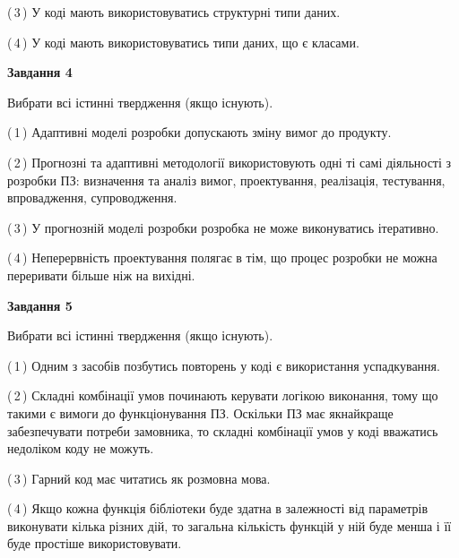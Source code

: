 \documentclass[10pt, ukrainian]{article}
\begin{document}
{\begin {large}
(\,3\,) У коді мають використовуватись структурні типи даних. %



(\,4\,) У коді мають використовуватись типи даних, що є класами. %


{\begin {center}\textbf{Завдання 4}\end {center}}\par
Вибрати всі істинні твердження (якщо існують).\par
\vspace{2mm}



(\,1\,) Адаптивні моделі розробки допускають зміну вимог до продукту. %



(\,2\,) Прогнозні та адаптивні методології використовують одні ті самі діяльності з розробки ПЗ: визначення та аналіз вимог, проектування, реалізація, тестування, впровадження, супроводження. %



(\,3\,) У прогнозній моделі розробки розробка не може виконуватись ітеративно. %



(\,4\,) Неперервність проектування полягає в тім, що процес розробки не можна переривати більше ніж на вихідні. %


{\begin {center}\textbf{Завдання 5}\end {center}}\par
Вибрати всі істинні твердження (якщо існують).\par
\vspace{2mm}



(\,1\,) Одним з засобів позбутись повторень у коді є використання успадкування. %



(\,2\,) Складні комбінації умов починають керувати логікою виконання, тому що такими є вимоги до функціонування ПЗ. Оскільки ПЗ має якнайкраще забезпечувати потреби замовника, то складні комбінації умов у коді вважатись недоліком коду не можуть. %



(\,3\,) Гарний код має читатись як розмовна мова. %



(\,4\,) Якщо кожна функція бібліотеки буде здатна в залежності від параметрів виконувати кілька різних дій, то загальна кількість функцій у ній буде менша і її буде простіше використовувати. %


\end{large}}
\end{document}
